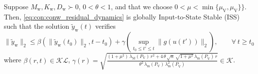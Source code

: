 \begin{theorem}\label{theorem:con:iss}
    Suppose $M_\mathrm{w}, K_\mathrm{w}, D_\mathrm{w} \succ 0$, $0 < \theta < 1$, and that we choose $0 < \mu < \min \{ \mu_{\mathrm{V}}, \mu_{\dot{\mathrm{V}}} \}\}$. Then,
    \eqref{eq:con:conw_residual_dynamics} is globally Input-to-State Stable (ISS)
    such that the solution $\tilde{y}_\mathrm{w}(t)$ verifies
    \begin{equation}\label{eq:con:input_to_state_stability}
        \lVert \tilde{y}_\mathrm{w} \rVert_2 \leq \beta \left (\lVert \tilde{y}_\mathrm{w}(t_0) \rVert_2, t-t_0 \right ) + \gamma \left ( \sup_{t_0 \leq t' \leq t} \lVert g(u(t')) \rVert_2 \right ), \qquad \forall \: t \geq t_0
    \end{equation}
    where $\beta(r, t) \in \mathcal{KL}$, $\gamma(r) = \sqrt{\frac{(1+\mu^2) \, \lambda_\mathrm{M}(P_\mathrm{V}) \, r^2 + 4 \, \theta \, \sqrt{n} \, \sqrt{1+\mu^2} \, \lambda_\mathrm{m}(P_{\dot{\mathrm{V}}}) \, r}{\theta^2 \, \lambda_\mathrm{m}(P_\mathrm{V}) \, \lambda_\mathrm{m}^2(P_{\dot{\mathrm{V}}})}} \in \mathcal{K}$.
\end{theorem}
